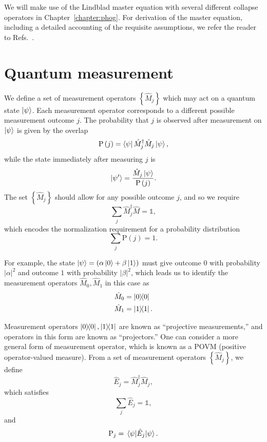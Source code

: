 We will make use of the Lindblad master equation with several different collapse operators in Chapter~\ref{chapter:phog}. For derivation of the master equation, including a detailed accounting of the requisite assumptions, we refer the reader to Refs.~\cite{Breuer2002, Carmichael1999}.



\FloatBarrier
\section{Quantum measurement}
We define a set of measurement operators $\left\{\hat{M}_j\right\}$ which may act on a quantum state $\ket{\psi}$. Each measurement operator corresponds to a different possible measurement outcome $j$. The probability that $j$ is observed after measurement on $\ket{\psi}$ is given by the overlap
\begin{equation}
\text{P}\left(j\right) = \bra{\psi}\hat{M}^\dagger_j \hat{M}_j\ket{\psi},
\end{equation}
while the state immediately after measuring $j$ is 
\begin{equation}
\ket{\psi^\prime} = \frac{\hat{M}_j \ket{\psi}}{\text{P}\left(j\right)}.
\end{equation}
The set $\left\{\hat{M}_j\right\}$ should allow for any possible outcome $j$, and so we require
\begin{equation}
\sum_j \hat{M}_j^\dagger \hat{M} = \mathds{1},
\end{equation}
which encodes the normalization requirement for a probability distribution
\begin{equation}
\sum_j \text{P}\left(j\right) = 1.
\end{equation}

\noindent For example, the state $\ket{\psi} = \left(\alpha\ket{0}  + \beta\ket{1}\right)$ must give outcome $0$ with probability $\left|\alpha\right|^2$ and outcome $1$ with probability $\left|\beta\right|^2$, which leads us to identify the measurement operators $\hat{M}_0, \hat{M}_1$ in this case as
\begin{align*}
&\hat{M}_0 = \dyad{0} \\
&\hat{M}_1 = \dyad{1}.
\end{align*}

\noindent Measurement operators $\dyad{0}, \dyad{1}$ are known as ``projective measurements,'' and operators in this form are known as ``projectors.'' One can consider a more general form of measurement operator, which is known as a POVM (positive operator-valued measure). From a set of measurement operators $\left\{\hat{M}_j\right\}$, we define
\begin{equation}
\hat{E}_j = \hat{M}^\dagger_j \hat{M}_j,
\end{equation}
which satisfies
\begin{equation}
\sum_j \hat{E}_j = \mathds{1},
\end{equation}
and
\begin{equation}
\text{P}_j = \ev{\hat{E}_j}{\psi}.
\end{equation}

